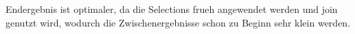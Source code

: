 \documentclass{article}
\begin{document}
\begin{enumerate}
            Endergebnis ist optimaler, da die Selections frueh angewendet werden und join genutzt wird, wodurch die Zwischenergebnisse schon zu Beginn sehr klein werden.

    \end{enumerate}
\end{document}
